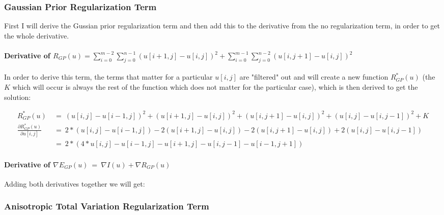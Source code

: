 \documentclass{report}
\begin{document}
			\subsubsection{Gaussian Prior Regularization Term}
			\startsubsection
				First I will derive the Gussian prior regularization term and then add this to the derivative from the no regularization term, in order to get the whole derivative.
				\vspace{-0.4cm} \paragraph{Derivative of $R_{GP}(u) = \sum_{i=0}^{m-2} \sum_{j=0}^{n-1} ( u[i+1,j] - u[i,j] )^2 + \sum_{i=0}^{m-1} \sum_{j=0}^{n-2} ( u[i,j+1] - u[i,j] )^2$}
				\startsubsection
					\vspace{0.2cm} In order to derive this term, the terms that matter for a particular $u[i,j]$ are "filtered" out and will create a new function $R_{GP}^*(u)$ (the $K$ which will occur is always the rest of the function which does not matter for the particular case), which is then derived to get the solution:
				\closesection
				\begin{adjustwidth}{-4em}{}
					\vspace{-0.5cm}
					\begin{align*}
						R_{GP}^*(u) \ & = \ (u[i,j] - u[i-1,j])^2 + (u[i+1,j] - u[i,j])^2 + (u[i,j+1] - u[i,j])^2 + (u[i,j] - u[i,j-1])^2 + K \\
						\frac{\partial R_{GP}^*(u)}{\partial u[i,j]} \ & = \ 2 * (u[i,j] - u[i-1,j]) - 2 (u[i+1,j] - u[i,j]) - 2 (u[i,j+1] - u[i,j]) + 2 (u[i,j] - u[i,j-1]) \\
						& = \ 2 * (4 * u[i,j] - u[i-1,j] - u[i+1,j] - u[i,j-1] - u[i-1,j+1])
					\end{align*}
				\end{adjustwidth}
				\vspace{-0.4cm} \paragraph{Derivative of $\nabla E_{GP}(u) \ = \ \nabla I(u) + \nabla R_{GP}(u)$}
				\startsubsection
					Adding both derivatives together we will get:
				\closesection
			\closesection
			\subsubsection{Anisotropic Total Variation Regularization Term}
			\startsubsection
			\closesection
		\closesection
\end{document}
